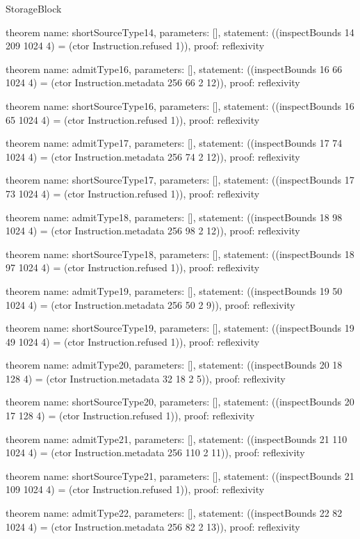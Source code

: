 \begin{lexlean}{StorageBlock}
\begin{semanticmodule}
theorem{
  name: shortSourceType14,
  parameters: [],
  statement: ((inspectBounds 14 209 1024 4) = (ctor Instruction.refused 1)),
  proof: reflexivity{}
}

theorem{
  name: admitType16,
  parameters: [],
  statement: ((inspectBounds 16 66 1024 4) = (ctor Instruction.metadata 256 66 2 12)),
  proof: reflexivity{}
}

theorem{
  name: shortSourceType16,
  parameters: [],
  statement: ((inspectBounds 16 65 1024 4) = (ctor Instruction.refused 1)),
  proof: reflexivity{}
}

theorem{
  name: admitType17,
  parameters: [],
  statement: ((inspectBounds 17 74 1024 4) = (ctor Instruction.metadata 256 74 2 12)),
  proof: reflexivity{}
}

theorem{
  name: shortSourceType17,
  parameters: [],
  statement: ((inspectBounds 17 73 1024 4) = (ctor Instruction.refused 1)),
  proof: reflexivity{}
}

theorem{
  name: admitType18,
  parameters: [],
  statement: ((inspectBounds 18 98 1024 4) = (ctor Instruction.metadata 256 98 2 12)),
  proof: reflexivity{}
}

theorem{
  name: shortSourceType18,
  parameters: [],
  statement: ((inspectBounds 18 97 1024 4) = (ctor Instruction.refused 1)),
  proof: reflexivity{}
}

theorem{
  name: admitType19,
  parameters: [],
  statement: ((inspectBounds 19 50 1024 4) = (ctor Instruction.metadata 256 50 2 9)),
  proof: reflexivity{}
}

theorem{
  name: shortSourceType19,
  parameters: [],
  statement: ((inspectBounds 19 49 1024 4) = (ctor Instruction.refused 1)),
  proof: reflexivity{}
}

theorem{
  name: admitType20,
  parameters: [],
  statement: ((inspectBounds 20 18 128 4) = (ctor Instruction.metadata 32 18 2 5)),
  proof: reflexivity{}
}

theorem{
  name: shortSourceType20,
  parameters: [],
  statement: ((inspectBounds 20 17 128 4) = (ctor Instruction.refused 1)),
  proof: reflexivity{}
}

theorem{
  name: admitType21,
  parameters: [],
  statement: ((inspectBounds 21 110 1024 4) = (ctor Instruction.metadata 256 110 2 11)),
  proof: reflexivity{}
}

theorem{
  name: shortSourceType21,
  parameters: [],
  statement: ((inspectBounds 21 109 1024 4) = (ctor Instruction.refused 1)),
  proof: reflexivity{}
}

theorem{
  name: admitType22,
  parameters: [],
  statement: ((inspectBounds 22 82 1024 4) = (ctor Instruction.metadata 256 82 2 13)),
  proof: reflexivity{}
}


\end{semanticmodule}
\end{lexlean}
